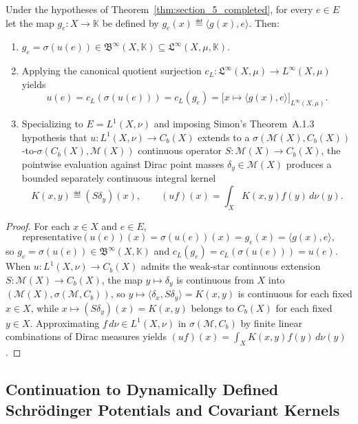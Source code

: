 \begin{theorem}
\label{thm:section_6_completed}
Under the hypotheses of Theorem~\ref{thm:section_5_completed}, for every $e \in E$ let the map $g_e : X \to \mathbb{K}$ be defined by $g_e(x) \eqdef \langle g(x), e \rangle$. Then:
\begin{enumerate}
  \item $g_e = \sigma(u(e)) \in \mathfrak{B}^\infty(X, \mathbb{K}) \subseteq \mathfrak{L}^\infty(X, \mu, \mathbb{K})$.
  \item Applying the canonical quotient surjection $c_L : \mathfrak{L}^\infty(X, \mu) \to L^\infty(X, \mu)$ yields
  \[
    u(e) = c_L(\sigma(u(e))) = c_L(g_e) = \bigl[x \mapsto \langle g(x), e \rangle\bigr]_{L^\infty(X, \mu)}.
  \]
  \item Specializing to $E = L^1(X, \nu)$ and imposing Simon's Theorem~A.1.3 hypothesis that $u : L^1(X, \nu) \to C_b(X)$ extends to a $\sigma(\mathcal{M}(X), C_b(X))$-to-$\sigma(C_b(X), \mathcal{M}(X))$ continuous operator $S : \mathcal{M}(X) \to C_b(X)$, the pointwise evaluation against Dirac point masses $\delta_y \in \mathcal{M}(X)$ produces a bounded separately continuous integral kernel
  \[
    K(x, y) \eqdef (S \delta_y)(x), \qquad (u f)(x) = \int_X K(x, y) f(y)\,d\nu(y).
  \]
\end{enumerate}
\end{theorem}
\begin{proof}
For each $x \in X$ and $e \in E$,
\[
  \mathrm{representative}(u(e))(x) = \sigma(u(e))(x) = g_e(x) = \langle g(x), e \rangle,
\]
so $g_e = \sigma(u(e)) \in \mathfrak{B}^\infty(X, \mathbb{K})$ and $c_L(g_e) = c_L(\sigma(u(e))) = u(e)$. When $u : L^1(X, \nu) \to C_b(X)$ admits the weak-star continuous extension $S : \mathcal{M}(X) \to C_b(X)$, the map $y \mapsto \delta_y$ is continuous from $X$ into $(\mathcal{M}(X), \sigma(\mathcal{M}, C_b))$, so $y \mapsto \langle \delta_x, S\delta_y \rangle = K(x, y)$ is continuous for each fixed $x \in X$, while $x \mapsto (S\delta_y)(x) = K(x, y)$ belongs to $C_b(X)$ for each fixed $y \in X$. Approximating $f\,d\nu \in L^1(X, \nu)$ in $\sigma(\mathcal{M}, C_b)$ by finite linear combinations of Dirac measures yields $(u f)(x) = \int_X K(x, y) f(y)\,d\nu(y)$.
\end{proof}

\subsection{Continuation to Dynamically Defined Schr\"odinger Potentials and Covariant Kernels}

